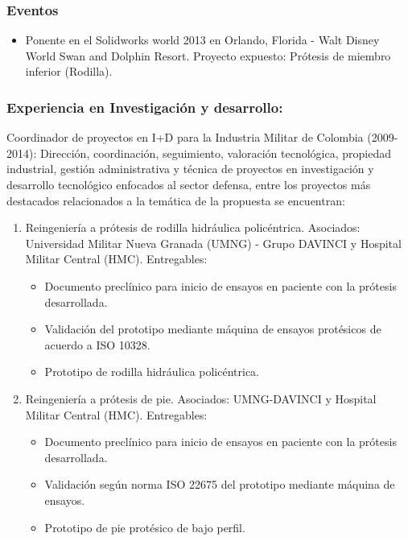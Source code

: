 \documentclass[12pt,english]{article}
\begin{document}
\subsubsection*{Eventos}
\begin{itemize}
\item Ponente en el Solidworks world 2013 en Orlando, Florida - Walt Disney
World Swan and Dolphin Resort. Proyecto expuesto: Prótesis de miembro inferior (Rodilla).
\end{itemize}

\subsubsection*{Experiencia en Investigación y desarrollo:}

Coordinador de proyectos en I+D para la Industria Militar de Colombia
(2009-2014): Dirección, coordinación, seguimiento, valoración tecnológica,
propiedad industrial, gestión administrativa y técnica de proyectos
en investigación y desarrollo tecnológico enfocados al sector defensa,
entre los proyectos más destacados relacionados a la temática de la
propuesta se encuentran:
\begin{enumerate}
\item Reingeniería a prótesis de rodilla hidráulica policéntrica. Asociados:
Universidad Militar Nueva Granada (UMNG) - Grupo DAVINCI y Hospital
Militar Central (HMC). Entregables:

\begin{itemize}
\item Documento preclínico para inicio de ensayos en paciente con la prótesis desarrollada.
\item Validación del prototipo mediante máquina de ensayos protésicos de acuerdo a ISO 10328.
\item Prototipo de rodilla hidráulica policéntrica.
\end{itemize}
\item Reingeniería a prótesis de pie. Asociados: UMNG-DAVINCI y Hospital
Militar Central (HMC). Entregables: 

\begin{itemize}
\item Documento preclínico para inicio de ensayos en paciente con la prótesis desarrollada.
\item Validación según norma ISO 22675 del prototipo mediante máquina de ensayos.
\item Prototipo de pie protésico de bajo perfil.
\end{itemize}

\end{enumerate}
\end{document}
